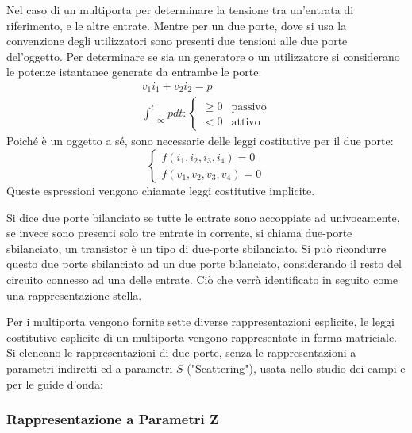 \documentclass{article}
\numberwithin{equation}{subsection}
\begin{document}
Nel caso di un multiporta per determinare la tensione tra un'entrata di riferimento, e le altre entrate. Mentre per un due porte, dove si usa la convenzione degli utilizzatori 
sono presenti due tensioni alle due porte del'oggetto. Per determinare se sia un generatore o un utilizzatore si considerano 
le potenze istantanee generate da entrambe le porte:
\begin{gather*}
    v_1i_1+v_2i_2=p\\
    \displaystyle\int_{-\infty}^tp dt:\begin{cases}
        \geq0&\mbox{passivo}\\
        <0&\mbox{attivo}
    \end{cases}
\end{gather*} 
Poiché è un oggetto a sé, sono necessarie delle leggi costitutive per il due porte:
\begin{equation*}
    \begin{cases}
        f(i_1,i_2,i_3,i_4)=0\\
        f(v_1,v_2,v_3,v_4)=0
    \end{cases}
\end{equation*}
Queste espressioni vengono chiamate leggi costitutive implicite. 


Si dice due porte bilanciato se tutte le entrate sono accoppiate ad univocamente, se invece sono presenti solo tre entrate in corrente, si chiama due-porte sbilanciato, 
un transistor è un tipo di due-porte sbilanciato. Si può ricondurre questo due porte sbilanciato ad un due porte bilanciato, considerando il resto del circuito connesso 
ad una delle entrate. Ciò che verrà identificato in seguito come una rappresentazione stella. 


Per i multiporta vengono fornite sette diverse rappresentazioni esplicite, le leggi costitutive esplicite di un multiporta vengono rappresentate in forma matriciale. Si elencano 
le rappresentazioni di due-porte, senza le rappresentazioni a parametri indiretti ed a parametri $S$ ("Scattering"), usata nello studio dei campi e per le guide d'onda:

\subsubsection{Rappresentazione a Parametri Z}
\end{document}
